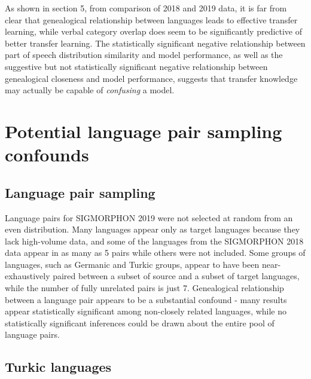 As shown in section 5, from comparison of 2018 and 2019 data, it is far from clear that genealogical relationship between languages leads to effective transfer learning, while verbal category overlap does seem to be significantly predictive of better transfer learning. The statistically significant negative relationship between part of speech distribution similarity and model performance, as well as the suggestive but not statistically significant negative relationship between genealogical closeness and model performance, suggests that transfer knowledge may actually be capable of \textit{confusing} a model. 




\section{Potential language pair sampling confounds}

\subsection{Language pair sampling}

Language pairs for SIGMORPHON 2019 were not selected at random from an even distribution. Many languages appear only as target languages because they lack high-volume data, and some of the languages from the SIGMORPHON 2018 data appear in as many as 5 pairs while others were not included. Some groups of languages, such as Germanic and Turkic groups, appear to have been near-exhaustively paired between a subset of source and a subset of target languages, while the number of fully unrelated pairs is just 7. Genealogical relationship between a language pair appears to be a substantial confound - many results appear statistically significant among non-closely related languages, while no statistically significant inferences could be drawn about the entire pool of language pairs.

\subsection{Turkic languages}

